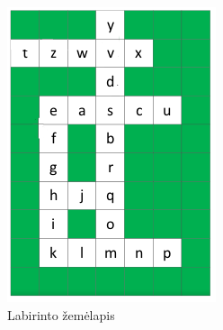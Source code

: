 \begin{figure}[H]
  \centering
  \includegraphics[]{content/map.png}
  \caption{Labirinto žemėlapis}
  \label{fig:bc:map}
\end{figure}


